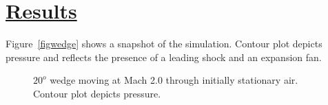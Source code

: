 \documentclass[fleqn]{article}
\begin{document}
\section*{\underline{Results}}

Figure~\ref{figwedge} shows a snapshot of the simulation.  Contour
plot depicts pressure and reflects the presence of a leading shock
and an expansion fan.
\begin{figure}[b]
  \center
  \caption{$20^o$ wedge moving at Mach 2.0 through initially stationary
air.  Contour plot depicts pressure.}
  \label{figdisks}
\end{figure}


\end{document}
